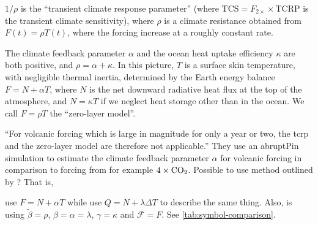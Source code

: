 \documentclass{ametsocV5}
\begin{document}
\(1/\rho \) is the ``transient climate response parameter'' (where
\(\mathrm{TCS}=F_{2\times}\times \mathrm{TCRP}\) is the transient climate sensitivity),
where \(\rho \) is a climate resistance obtained from \(F(t)=\rho T(t)\), where the
forcing increase at a roughly constant rate.

The climate feedback parameter \(\alpha\) and the ocean heat uptake efficiency
\(\kappa\) are both positive, and \(\rho =\alpha +\kappa \). In this picture, \(T\) is a
surface skin temperature, with negligible thermal inertia, determined by the Earth
energy balance \(F=N+\alpha T\), where \(N\) is the net downward radiative heat flux at
the top of the atmosphere, and \(N=\kappa T\) if we neglect heat storage other than in
the ocean. We call \(F=\rho T\) the ``zero-layer model''.

``For volcanic forcing which is large in magnitude for only a year or two, the
\ac{tcrp} and the zero-layer model are therefore not applicable.'' They
\citep{gregory2016} use an abruptPin simulation to estimate the climate feedback
parameter \(\alpha \) for volcanic forcing in comparison to forcing from for example
\(4\times \ce{CO2}\). Possible to use method outlined by \citet{merlis2014}? That is,

\citet{gregory2016} use \(F=N+\alpha T\) while \citet{jones2005} use \(Q=N+\lambda
\Delta T\) to describe the same thing. Also, \citet{merlis2014} is using
\(\tilde{\beta}=\rho\), \(\beta =\alpha =\lambda \), \(\gamma =\kappa \) and
\(\mathcal{F}=F\). See \cref{tab:symbol-comparison}.
\end{document}
